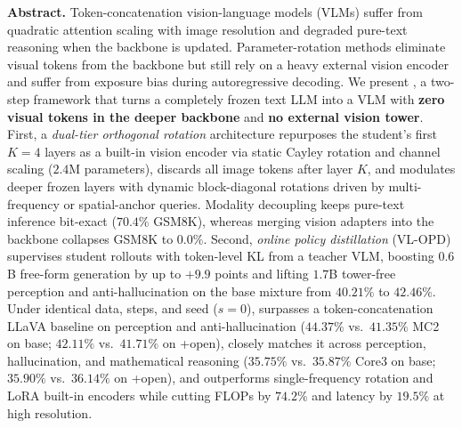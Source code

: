 \begin{center}
\begin{minipage}{0.92\textwidth}
\small
\textbf{Abstract.}
Token-concatenation vision-language models (VLMs) suffer from quadratic
attention scaling with image resolution and degraded pure-text reasoning when
the backbone is updated. Parameter-rotation methods eliminate visual tokens
from the backbone but still rely on a heavy external vision encoder and suffer
from exposure bias during autoregressive decoding. We present \modelname, a
two-step framework that turns a completely frozen text LLM into a VLM with
\textbf{zero visual tokens in the deeper backbone} and \textbf{no external
vision tower}. First, a \emph{dual-tier orthogonal rotation} architecture
repurposes the student's first $K{=}4$ layers as a built-in vision encoder via
static Cayley rotation and channel scaling ($2.4$M parameters), discards all
image tokens after layer $K$, and modulates deeper frozen layers with dynamic
block-diagonal rotations driven by multi-frequency or spatial-anchor queries.
Modality decoupling keeps pure-text inference bit-exact ($70.4\%$ GSM8K),
whereas merging vision adapters into the backbone collapses GSM8K to $0.0\%$.
Second, \emph{online policy distillation} (VL-OPD) supervises student rollouts
with token-level KL from a teacher VLM, boosting $0.6$B free-form generation
by up to $+9.9$ points and lifting $1.7$B tower-free perception and
anti-hallucination on the base mixture from $40.21\%$ to $42.46\%$. Under
identical data, steps, and seed ($s{=}0$), \modelname{} surpasses a
token-concatenation LLaVA baseline on perception and anti-hallucination
($44.37\%$ vs.\ $41.35\%$ MC2 on base; $42.11\%$ vs.\ $41.71\%$ on +open),
closely matches it across perception, hallucination, and mathematical reasoning
($35.75\%$ vs.\ $35.87\%$ Core3 on base; $35.90\%$ vs.\ $36.14\%$ on +open), and
outperforms single-frequency rotation and LoRA built-in encoders while cutting
FLOPs by $74.2\%$ and latency by $19.5\%$ at high resolution.
\end{minipage}
\end{center}
